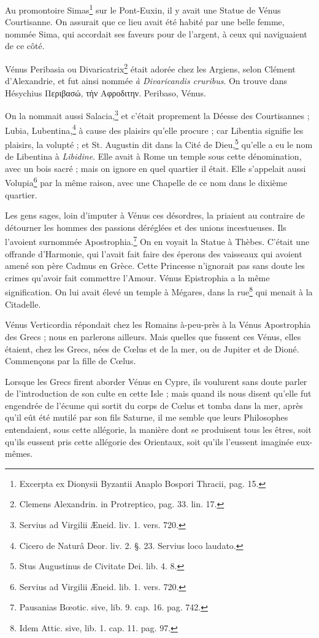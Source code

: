 \documentclass[a4paper, 11pt, oneside, polutonikogreek, french]{article}
\begin{document}
Au promontoire Simas\footnote{Excerpta ex Dionysii Byzantii Anaplo Bospori Thracii, pag. 15.} sur le Pont-Euxin, il y avait une Statue de Vénus Courtisanne. On assurait que ce lieu avait été habité par une belle femme, nommée Sima, qui accordait ses faveurs pour de l'argent, à ceux qui naviguaient de ce côté.

Vénus Peribasia ou Divaricatrix\footnote{Clemens Alexandrin. in Protreptico, pag. 33. lin. 17.} était adorée chez les Argiens, selon Clément d'Alexandrie, et fut ainsi nommée \emph{à Divaricandis cruribus}. On trouve dans Hésychius Περιβασώ, τήν Αφροδιτην. Peribaso, Vénus.

On la nommait aussi Salacia,\footnote{Servius ad Virgilii Æneid. liv. 1. vers. 720.} et c'était proprement la Déesse des Courtisannes ; Lubia, Lubentina,\footnote{Cicero de Naturâ Deor. liv. 2. §. 23. Servius loco laudato.} à cause des plaisirs qu'elle procure ; car Libentia signifie les plaisirs, la volupté ; et St. Augustin dit dans la Cité de Dieu,\footnote{Stus Augustinus de Civitate Dei. lib. 4. 8.} qu'elle a eu le nom de Libentina à \emph{Libidine}. Elle avait à Rome un temple sous cette dénomination, avec un bois sacré ; mais on ignore en quel quartier il était. Elle s'appelait aussi Volupia\footnote{Servius ad Virgilii Æneid. lib. 1. vers. 720.} par la même raison, avec une Chapelle de ce nom dans le dixième quartier.

Les gens sages, loin d'imputer à Vénus ces désordres, la priaient au contraire de détourner les hommes des passions déréglées et des unions incestueuses. Ils l'avoient surnommée Apostrophia.\footnote{Pausanias Bœotic. sive, lib. 9. cap. 16. pag. 742.} On en voyait la Statue à Thèbes. C'était une offrande d'Harmonie, qui l'avait fait faire des éperons des vaisseaux qui avoient amené son père Cadmus en Grèce. Cette Princesse n'ignorait pas sans doute les crimes qu'avoir fait commettre l'Amour. Vénus Epistrophia a la même signification. On lui avait élevé un temple à Mégares, dans la rue\footnote{Idem Attic. sive, lib. 1. cap. 11. pag. 97.} qui menait à la Citadelle.

Vénus Verticordia répondait chez les Romains à-peu-près à la Vénus Apostrophia des Grecs ; nous en parlerons ailleurs. Mais quelles que fussent ces Vénus, elles étaient, chez les Grecs, nées de Cœlus et de la mer, ou de Jupiter et de Dioné. Commençons par la fille de Cœlus.

Lorsque les Grecs firent aborder Vénus en Cypre, ils voulurent sans doute parler de l'introduction de son culte en cette Isle ; mais quand ils nous disent qu'elle fut engendrée de l'écume qui sortit du corps de Cœlus et tomba dans la mer, après qu'il eût été mutilé par son fils Saturne, il me semble que leurs Philosophes entendaient, sous cette allégorie, la manière dont se produisent tous les êtres, soit qu'ils eussent pris cette allégorie des Orientaux, soit qu'ils l'eussent imaginée eux-mêmes.
\end{document}
